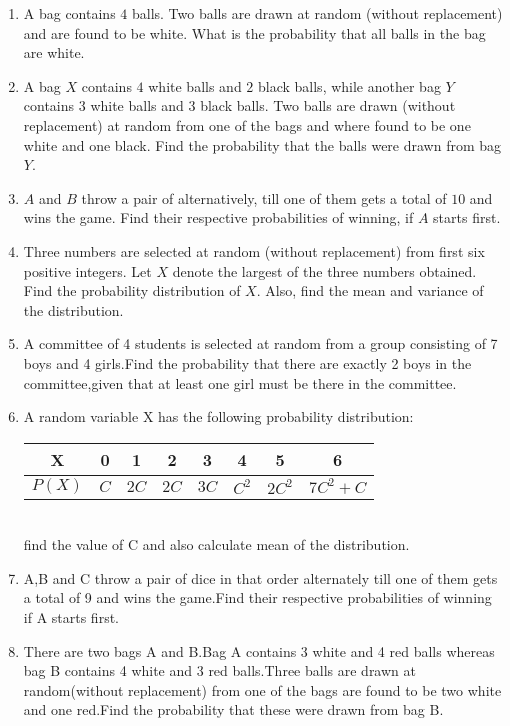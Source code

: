 \begin{enumerate}
    \item A bag contains $4$ balls. Two balls are drawn at random (without replacement) and are found to be white. What is the probability that all balls in the bag are white.
    \item A bag $X$ contains $4$ white balls and $2$ black balls, while another bag $Y$ contains $3$ white balls and $3$ black balls. Two balls are drawn (without replacement) at random from  one of the bags and where found to be one white and one black. Find the probability that the balls were  drawn from bag $Y$.
    \item $A$ and $B$ throw a pair of alternatively, till one of them gets a total of $10$ and wins the game. Find their respective probabilities of winning, if $A$ starts first.
    \item Three numbers are selected at random (without replacement) from first six positive integers. Let $X$ denote the largest of the three numbers obtained. Find the probability distribution of $X$. Also, find the mean and variance of the distribution.
    \item A committee of 4 students is selected at random from a group consisting of 7 boys and 4 girls.Find the probability that there are exactly 2 boys in the committee,given that at least one girl must be there in the committee.

    \item A random variable X has the following probability distribution:\\
          \begin{tabular}{|c|c|c|c|c|c|c|c|}
              \hline
              X      & 0   & 1    & 2    & 3    & 4       & 5        & 6          \\
              \hline
              $P(X)$ & $C$ & $2C$ & $2C$ & $3C$ & $C^{2}$ & $2C^{2}$ & $7C^{2}+C$ \\
              \hline
          \end{tabular}\\
          find the value of C and also calculate mean of the distribution.
    \item A,B and C throw a pair of dice in that order alternately till one of them gets a total of 9 and wins the game.Find their respective probabilities of winning if A starts first.
    \item There are two bags A and B.Bag A contains 3 white and 4 red balls whereas bag B contains 4 white and 3 red balls.Three balls are drawn at random(without replacement) from one of the bags are found to be two white and one red.Find the probability that these were drawn from bag B.

\end{enumerate}
